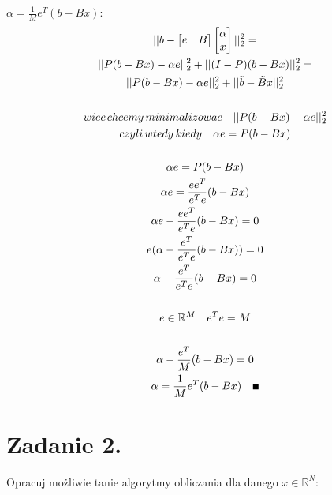 \documentclass[a4paper]{article}
\renewcommand\qedsymbol{\scalebox{0.75}{$\blacksquare$}} %
\newcommand{\R}{\mathbb R} %
\begin{document}
\begin{enumerate}[label=(\alph*)]
            $\alpha = \frac{1}{M}e^{T}(b - Bx)$:
            \begin{gather*}
               ||
                  b -
                  \begin{bmatrix}
                     e & B
                  \end{bmatrix}
                  \begin{bmatrix}
                     \alpha \\
                     x \\
                  \end{bmatrix}
               ||_{2}^{2} = \\
               ||P (b - B x) - \alpha e||_{2}^{2} + ||(I - P)(b - B x)||_{2}^{2} = \\
               ||P (b - B x) - \alpha e||_{2}^{2} + ||\tilde{b} - \tilde{B}x||_{2}^{2} \\
               \\
               wiec \, chcemy \, minimalizowac \quad ||P (b - B x) - \alpha e||_{2}^{2} \\
               czyli \, wtedy \, kiedy \quad \alpha e = P (b - B x) \\
               \\
               \alpha e = P (b - B x) \\
               \alpha e = \frac{e e^{T}}{e^{T} e}(b - B x) \\
               \alpha e - \frac{e e^{T}}{e^{T} e}(b - B x) = 0 \\
               e (\alpha - \frac{e^{T}}{e^{T} e}(b - B x)) = 0 \\
               \alpha - \frac{e^{T}}{e^{T} e}(b - B x) = 0 \\
               \\
               e \in \R^{M} \quad e^{T} e = M \\
               \\
               \alpha - \frac{e^{T}}{M}(b - B x) = 0 \\
               \alpha = \frac{1}{M} e^{T} (b - B x) \quad \qedsymbol
            \end{gather*}
      \end{enumerate}


   \section*{Zadanie 2.}

      Opracuj możliwie tanie algorytmy obliczania dla danego $x \in \R^{N}$:
\end{document}
